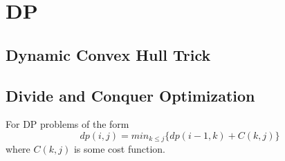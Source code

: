 \section{DP}
  \subsection{Dynamic Convex Hull Trick}
  \subsection{Divide and Conquer Optimization}
    For DP problems of the form $$dp(i,j) = min_{k \leq j}\{dp(i-1,k)+C(k,j)\}$$ where $C(k,j)$ is some cost function.
